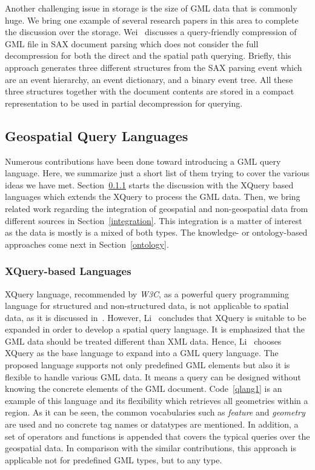 \documentclass[a4paper,12pt]{article}
\begin{document}
Another challenging issue in storage is the size of GML data that is commonly huge. 
We bring one example of several research papers in this area to complete the discussion over the storage.
Wei~\cite{Wei2011} discusses a query-friendly compression of GML file in SAX document 
parsing which does not consider the full decompression for both the direct and the spatial path querying. 
Briefly, this approach generates three different structures from the SAX parsing event
which are an event hierarchy, an event dictionary, and a binary event tree.
All these three structures together with the document contents are stored in a compact
representation to be used in partial decompression for querying.%

\subsection{Geospatial Query Languages}
\label{queryLang}
Numerous contributions have been done toward introducing a GML query language.
Here, we summarize just a short list of them trying to cover the various ideas we have met. %
Section~\ref{xquery-based} starts the discussion with the XQuery based languages which extends the XQuery
to process the GML data.
Then, we bring related work regarding the integration of geospatial and non-geospatial
data from different sources in Section~\ref{integration}. This integration is a matter of interest
as the data is mostly is a mixed of both types. The knowledge- or ontology-based approaches 
come next in Section~\ref{ontology}.

\subsubsection{XQuery-based Languages}
\label{xquery-based}
XQuery language, recommended by \emph{W3C}, as a powerful query programming language for structured and non-structured data, 
is not applicable to spatial data, as it is discussed in~\cite{Lisa2006,Chen2010}. 
However, Li~\cite{Lisa2006} concludes that XQuery is suitable to be expanded in order to develop a spatial query language.
It is emphasized that the GML data should be treated different than XML data. Hence, Li~\cite{Lisa2006} chooses XQuery as the base language to expand into a GML query language. The proposed language supports not only predefined GML elements but also it is flexible to handle various GML data. 
It means a query can be designed without knowing the concrete elements of the GML document.
Code~\ref{qlang1} is an example of this language and its flexibility
which retrieves all geometries within a region. As it can be seen, 
the common vocabularies such as \textit{feature} and \textit{geometry} are used and no concrete tag names or datatypes are mentioned.
In addition, a set of operators and functions is appended that covers the typical queries over the geospatial data. 
In comparison with the similar contributions, this approach is applicable not for predefined GML types, but to any type.
\end{document}
